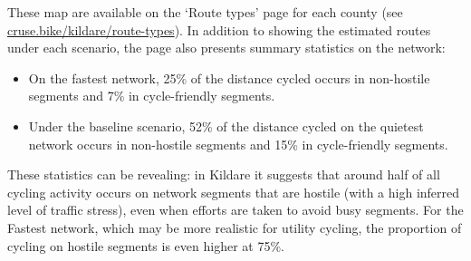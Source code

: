 \documentclass[
  super,
  preprint,
  3p]{elsarticle}
\begin{document}
These map are available on the `Route types' page for each county (see
\href{https://cruse.bike/kildare/route-types}{cruse.bike/kildare/route-types}).
In addition to showing the estimated routes under each scenario, the
page also presents summary statistics on the network:

\begin{itemize}
\item
  On the fastest network, 25\% of the distance cycled occurs in
  non-hostile segments and 7\% in cycle-friendly segments.
\item
  Under the baseline scenario, 52\% of the distance cycled on the
  quietest network occurs in non-hostile segments and 15\% in
  cycle-friendly segments.
\end{itemize}

These statistics can be revealing: in Kildare it suggests that around
half of all cycling activity occurs on network segments that are hostile
(with a high inferred level of traffic stress), even when efforts are
taken to avoid busy segments. For the Fastest network, which may be more
realistic for utility cycling, the proportion of cycling on hostile
segments is even higher at 75\%.
\end{document}
